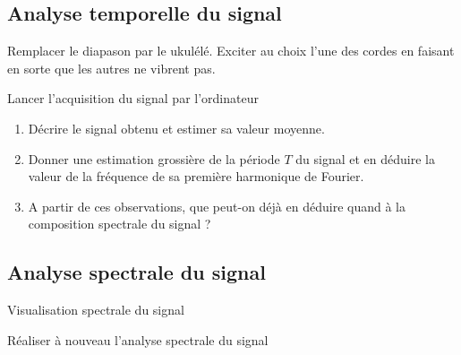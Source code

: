 \documentclass[a4paper,french,bookmarks]{article}
\begin{document}
\subsection{Analyse temporelle du signal}

\begin{experience}{}{}
    \begin{enumerate}
        \ithand Remplacer le diapason par le ukulélé. Exciter au choix l’une des cordes en faisant en sorte que les autres ne vibrent pas.
        
        \ithand Lancer l’acquisition du signal par l’ordinateur
    \end{enumerate}
\end{experience}


\begin{enumerate}[resume]
    \item Décrire le signal obtenu et estimer sa valeur moyenne.
    
    
    \item Donner une estimation grossière de la période $T$ du signal et en déduire la valeur de la fréquence de sa première harmonique de Fourier.
    
    
    \item A partir de ces observations, que peut-on déjà en déduire quand à la composition spectrale du signal ?
    
\end{enumerate}

\subsection{Analyse spectrale du signal}

\begin{experience}{Visualisation spectrale du signal}{}
    \begin{enumerate}
        \ithand Réaliser à nouveau l’analyse spectrale du signal
    \end{enumerate}
\end{experience}
\end{document}
